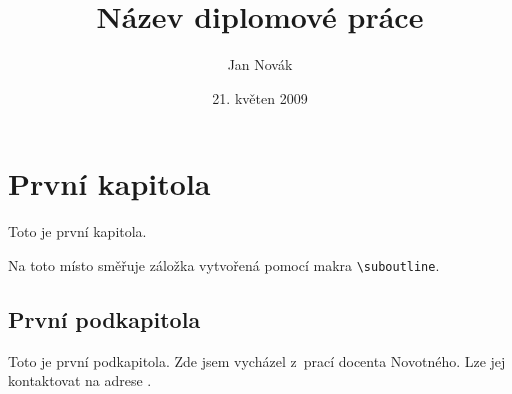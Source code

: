 \documentclass[12pt]{article}
\title{Název diplomové práce}
\author{Jan Novák}
\date{21. květen 2009}
\begin{document}
\maketitle

\section{První kapitola}
Toto je první kapitola.

\medskip
Na toto místo směřuje záložka vytvořená pomocí makra \verb|\suboutline|.

\subsection{První podkapitola}
Toto je první podkapitola.
Zde jsem vycházel z~prací docenta Novotného. Lze jej kontaktovat
na adrese .
\end{document}
